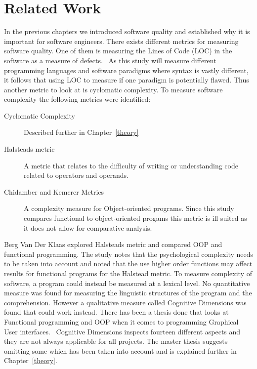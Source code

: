 \chapter{Related Work}\label{relatedwork}

In the previous chapters we introduced software quality and established why it
is important for software engineers. There exists different metrics for
measuring software quality. One of them is measuring the Lines of Code (LOC) in
the software as a measure of defects.~\cite{defectloc} As this study will
measure different programming languages and software paradigms where syntax is
vastly different, it follows that using LOC to measure if one paradigm is
potentially flawed. Thus another metric to look at is cyclomatic complexity. To
measure software complexity the following metrics were identified:

\begin{description}

    \item [Cyclomatic Complexity] Described further in Chapter~\ref{theory}

    \item [Halsteads metric] A metric that relates to the difficulty of writing
    or understanding code related to operators and operands.~\cite{bergklaas}

    \item [Chidamber and Kemerer Metrics~\cite{chidamber}] A complexity measure
    for Object-oriented programs. Since this study compares functional to
    object-oriented progams this metric is ill suited as it does not allow for
    comparative analysis.

\end{description}

Berg Van Der Klaas explored Halsteads metric and compared OOP and functional
programming. The study notes that the psychological complexity needs to be taken
into account and noted that the use higher order functions may affect results
for functional programs for the Halstead metric. To measure complexity of
software, a program could instead be measured at a lexical level. No
quantitative measure was found for measuring the linguistic structures of the
program and the comprehension. However a qualitative measure called Cognitive
Dimensions was found that could work instead. There has been a thesis done that
looks at Functional programming and OOP when it comes to programming Graphical
User interfaces.~\cite{euguenkiss} Cognitive Dimensions inspects
fourteen different aspects and they are not always applicable for all projects.
The master thesis suggests omitting some which has been taken into account and
is explained further in Chapter~\ref{theory}.
